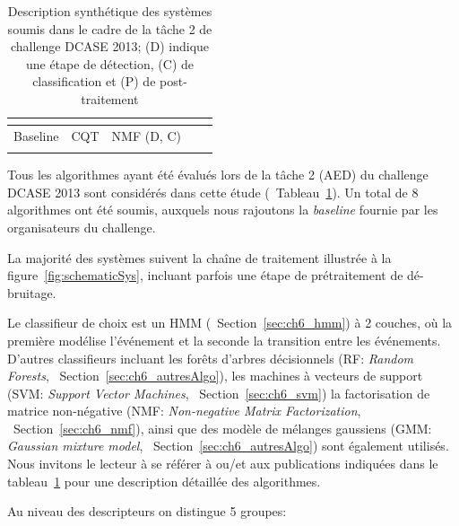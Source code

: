 \begin{table}[t]
\begin{center}
\begin{tabular}{lcccc}
\citep{VVK,gemmeke2013exemplar}     &                      &                              &           &             \\    
\hline
Baseline                            & CQT                  & NMF \hfill  (D, C)           &           &             \\ 
\citep{Giannoulis:2013a}            &                      &                              &           &             \\  
\hline      
\end{tabular}
\end{center}
\caption[Description synthétique des systèmes soumis dans le cadre de la tâche 2 de challenge DCASE 2013]{Description synthétique des systèmes soumis dans le cadre de la tâche 2 de challenge DCASE 2013; (D) indique une étape de détection, (C) de classification et (P) de post-traitement}
\label{tab:systemsDcase2013}
\end{table}

Tous les algorithmes ayant été évalués lors de la tâche 2 (AED) du challenge DCASE 2013 sont considérés dans cette étude (\cf~Tableau~\ref{tab:systemsDcase2013}). Un total de 8 algorithmes ont été soumis, auxquels nous rajoutons la \emph{baseline} fournie par les organisateurs du challenge.

La majorité des systèmes suivent la chaîne de traitement illustrée à la figure~\ref{fig:schematicSys}, incluant parfois une étape de prétraitement de dé-bruitage.

Le classifieur de choix est un HMM (\cf~Section~\ref{sec:ch6_hmm})  à 2 couches, où la première modélise l'événement et la seconde la transition entre les événements. D'autres classifieurs incluant les forêts d'arbres décisionnels (RF: \emph{Random Forests}, \cf~Section~\ref{sec:ch6_autresAlgo}), les machines à vecteurs de support (SVM: \emph{Support Vector Machines}, \cf~Section~\ref{sec:ch6_svm}) la factorisation de matrice non-négative (NMF: \emph{Non-negative Matrix Factorization}, \cf~Section~\ref{sec:ch6_nmf}), ainsi que des modèle de mélanges gaussiens (GMM: \emph{Gaussian mixture model}, \cf~Section~\ref{sec:ch6_autresAlgo}) sont également utilisés. Nous invitons le lecteur à se référer à \citep{Stowell15} ou/et aux publications indiquées dans le tableau~\ref{tab:systemsDcase2013} pour une description détaillée des algorithmes.


Au niveau des descripteurs on distingue 5 groupes:

